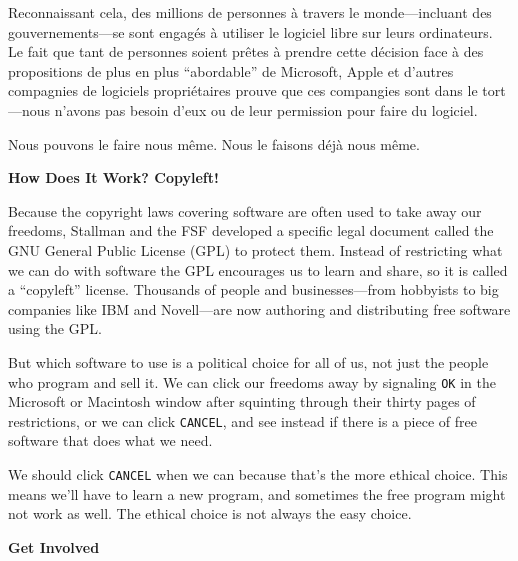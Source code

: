 \documentclass[twoside,12pt]{article}
\begin{document}

Reconnaissant cela, des millions de personnes à travers le monde---incluant des gouvernements---se sont engagés à utiliser le logiciel libre sur leurs ordinateurs. Le fait que tant de personnes soient prêtes à prendre cette décision face à des propositions de plus en plus ``abordable'' de Microsoft, Apple et d'autres compagnies de logiciels propriétaires prouve que ces compangies sont dans le tort---nous n'avons pas besoin d'eux ou de leur permission pour faire du logiciel.


Nous pouvons le faire nous même. Nous le faisons déjà nous même.

\begin{center}
{\Large\bf How Does It Work? Copyleft!}
\end{center}

Because the copyright laws covering software are often used to take away our
freedoms, Stallman and the FSF developed a specific legal document called the
GNU General Public License (GPL) to protect them. Instead of restricting what
we can do with software the GPL encourages us to learn and share, so it is
called a ``copyleft'' license. Thousands of people and businesses---from
hobbyists to big companies like IBM and Novell---are now authoring and
distributing free software using the GPL.

But which software to use is a political choice for all of us, not just the
people who program and sell it. We can click our freedoms away by signaling
{\tt OK} in the Microsoft or Macintosh window after squinting through their
thirty pages of restrictions, or we can click {\tt CANCEL}, and see instead if
there is a piece of free software that does what we need.

We should click {\tt CANCEL} when we can because that's the more ethical choice.
This means we'll have to learn a new program, and sometimes the free program
might not work as well. The ethical choice is not always the easy choice.

\begin{center}
{\Large\bf Get Involved}
\end{center}
\end{document}
